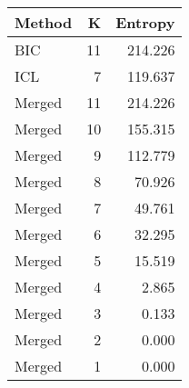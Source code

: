 \begin{center} 
\begin{tabular}{lrr}
 Method & K & Entropy \\ 
  \hline
\hline
BIC &   11 & 214.226 \\ 
  ICL &    7 & 119.637 \\ 
  Merged &   11 & 214.226 \\ 
  Merged &   10 & 155.315 \\ 
  Merged &    9 & 112.779 \\ 
  Merged &    8 & 70.926 \\ 
  Merged &    7 & 49.761 \\ 
  Merged &    6 & 32.295 \\ 
  Merged &    5 & 15.519 \\ 
  Merged &    4 & 2.865 \\ 
  Merged &    3 & 0.133 \\ 
  Merged &    2 & 0.000 \\ 
  Merged &    1 & 0.000 \\ 
  \end{tabular}
\end{center} 
